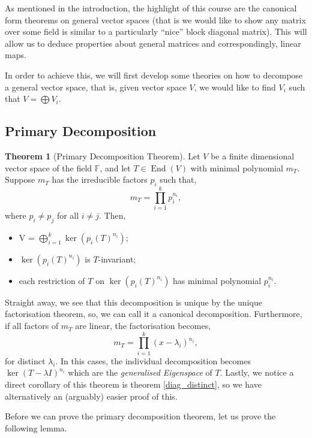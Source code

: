 \documentclass[
]{article}
\theoremstyle{definition}
\newtheorem{theorem}{Theorem}
\theoremstyle{definition}
\begin{document}
As mentioned in the introduction, the highlight of this course are the
canonical form theorems on general vector spaces (that is we would like
to show any matrix over some field is similar to a particularly ``nice''
block diagonal matrix). This will allow us to deduce properties about
general matrices and correspondingly, linear maps.

In order to achieve this, we will first develop some theories on how to
decompose a general vector space, that is, given vector space \(V\), we
would like to find \(V_i\) such that \(V = \bigoplus V_i\).

\hypertarget{primary-decomposition}{%
\subsection{Primary Decomposition}\label{primary-decomposition}}

\begin{theorem}[Primary Decomposition Theorem]
  Let \(V\) be a finite dimensional vector space of the field \(\mathbb{F}\), and 
  let \(T \in \mathop{\mathrm{End}}(V)\) with minimal polynomial \(m_T\). Suppose \(m_T\) has 
  the irreducible factors \(p_i\) such that,
  \[m_T = \prod_{i = 1}^k p_i^{n_i},\]
  where \(p_i \neq p_j\) for all \(i \neq j\). Then, 
  \begin{itemize}
    \item V = \(\bigoplus_{i = 1}^k \ker(p_i(T)^{n_i})\);
    \item \(\ker(p_i(T)^{n_i})\) is \(T\)-invariant;
    \item each restriction of \(T\) on \(\ker(p_i(T)^{n_i})\) has minimal polynomial 
      \(p_i^{n_i}\).
  \end{itemize}
\end{theorem}

Straight away, we see that this decomposition is unique by the unique
factorisation theorem, so, we can call it a canonical decomposition.
Furthermore, if all factors of \(m_T\) are linear, the factorisation
becomes, \[m_T = \prod_{i = 1}^k (x - \lambda_i)^{n_i},\] for distinct
\(\lambda_i\). In this cases, the individual decomposition becomes
\(\ker (T - \lambda I)^{n_i}\) which are the \emph{generalised
Eigenspace} of \(T\). Lastly, we notice a direct corollary of this
theorem is theorem \ref{diag_distinct}, so we have alternatively an
(arguably) easier proof of this.

Before we can prove the primary decomposition theorem, let us prove the
following lemma.
\end{document}
